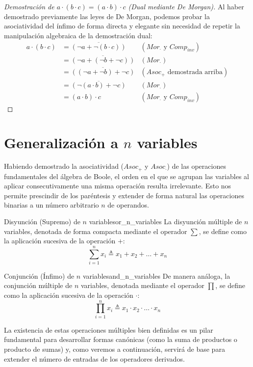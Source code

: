 {\begin{proof}[Demostración de $a \cdot (b \cdot c) = (a \cdot b) \cdot c$ (Dual mediante De Morgan)]
Al haber demostrado previamente las leyes de De Morgan, podemos probar la asociatividad del ínfimo de forma directa y elegante sin necesidad de repetir la manipulación algebraica de la demostración dual:
\begin{align*}
    a \cdot (b \cdot c) &= \overline{(\neg a + \neg (b \cdot c))} & (Mor_\cdot \text{ y } Comp_{inv}) \\
                          &= \overline{(\neg a + (\neg b + \neg c))} & (Mor_\cdot) \\
                          &= \overline{((\neg a + \neg b) + \neg c)} & (Asoc_+ \text{ demostrada arriba}) \\
                          &= \overline{(\neg (a \cdot b) + \neg c)} & (Mor_\cdot) \\
                          &= (a \cdot b) \cdot c & (Mor_\cdot \text{ y } Comp_{inv})
\end{align*}
\end{proof}
}

\section{Generalización a $n$ variables}

Habiendo demostrado la asociatividad ($Asoc_+$ y $Asoc_\cdot$) de las operaciones fundamentales del álgebra de Boole, el orden en el que se agrupan las variables al aplicar consecutivamente una misma operación resulta irrelevante. Esto nos permite prescindir de los paréntesis y extender de forma natural las operaciones binarias a un número arbitrario $n$ de operandos.

\begin{definicion}{Disyunción (Supremo) de $n$ variables}{or_n_variables}
La disyunción múltiple de $n$ variables, denotada de forma compacta mediante el operador $\sum$, se define como la aplicación sucesiva de la operación $+$:
\[ \sum_{i=1}^n x_i \triangleq x_1 + x_2 + \dots + x_n \]
\end{definicion}

\begin{definicion}{Conjunción (Ínfimo) de $n$ variables}{and_n_variables}
De manera análoga, la conjunción múltiple de $n$ variables, denotada mediante el operador $\prod$, se define como la aplicación sucesiva de la operación $\cdot$:
\[ \prod_{i=1}^n x_i \triangleq x_1 \cdot x_2 \cdot \dots \cdot x_n \]
\end{definicion}

La existencia de estas operaciones múltiples bien definidas es un pilar fundamental para desarrollar formas canónicas (como la suma de productos o producto de sumas) y, como veremos a continuación, servirá de base para extender el número de entradas de los operadores derivados.


